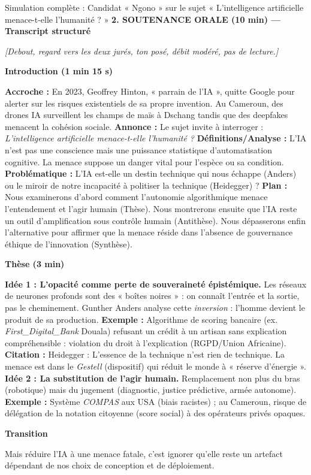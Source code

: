 \documentclass[11pt]{article}
\begin{document}
\begin{exoresolu}{Simulation complète : Candidat « Ngono » sur le sujet « L'intelligence artificielle menace-t-elle l'humanité ? »}
\textbf{2. SOUTENANCE ORALE (10 min) — Transcript structuré}

\textit{[Debout, regard vers les deux jurés, ton posé, débit modéré, pas de lecture.]}

\textbf{Introduction (1 min 15 s)} \par
\og \textbf{Accroche :} En 2023, Geoffrey Hinton, « parrain de l'IA », quitte Google pour alerter sur les risques existentiels de sa propre invention. Au Cameroun, des drones IA surveillent les champs de maïs à Dschang tandis que des deepfakes menacent la cohésion sociale. \textbf{Annonce :} Le sujet invite à interroger : \emph{L'intelligence artificielle menace-t-elle l'humanité ?} \textbf{Définitions/Analyse :} L'IA n'est pas une conscience mais une puissance statistique d'automatisation cognitive. La menace suppose un danger vital pour l'espèce ou sa condition. \textbf{Problématique :} L'IA est-elle un destin technique qui nous échappe (Anders) ou le miroir de notre incapacité à politiser la technique (Heidegger) ? \textbf{Plan :} Nous examinerons d'abord comment l'autonomie algorithmique menace l'entendement et l'agir humain (Thèse). Nous montrerons ensuite que l'IA reste un outil d'amplification sous contrôle humain (Antithèse). Nous dépasserons enfin l'alternative pour affirmer que la menace réside dans l'absence de gouvernance éthique de l'innovation (Synthèse). \fg{}

\textbf{Thèse (3 min)} \par
\og \textbf{Idée 1 : L'opacité comme perte de souveraineté épistémique.} Les réseaux de neurones profonds sont des « boîtes noires » : on connaît l'entrée et la sortie, pas le cheminement. Gunther Anders analyse cette \emph{inversion} : l'homme devient le produit de sa production. \textbf{Exemple :} Algorithme de scoring bancaire (ex. \emph{First\_Digital\_Bank} Douala) refusant un crédit à un artisan sans explication compréhensible : violation du droit à l'explication (RGPD/Union Africaine). \textbf{Citation :} Heidegger : \og L'essence de la technique n'est rien de technique.\fg{} La menace est dans le \emph{Gestell} (dispositif) qui réduit le monde à « réserve d'énergie ».
\textbf{Idée 2 : La substitution de l'agir humain.} Remplacement non plus du bras (robotique) mais du jugement (diagnostic, justice prédictive, armée autonome). \textbf{Exemple :} Système \emph{COMPAS} aux USA (biais racistes) ; au Cameroun, risque de délégation de la notation citoyenne (score social) à des opérateurs privés opaques. \fg{}

\textbf{Transition} \par
\og Mais réduire l'IA à une menace fatale, c'est ignorer qu'elle reste un artefact dépendant de nos choix de conception et de déploiement. \fg{}


\end{exoresolu}
\end{document}
